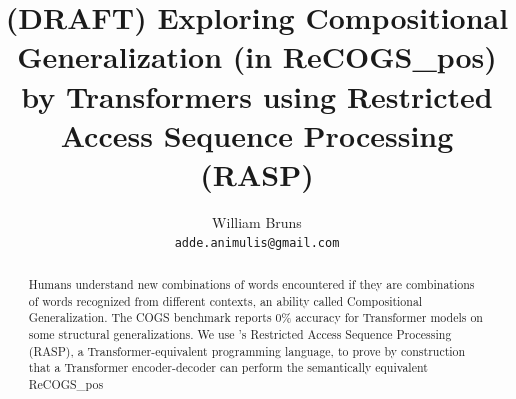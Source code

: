 \documentclass[11pt]{article}
\title{(DRAFT) Exploring Compositional Generalization (in ReCOGS\_pos) by Transformers using Restricted Access Sequence Processing (RASP)}
\author{William Bruns \\
  \texttt{adde.animulis@gmail.com}
}
\begin{document}
\maketitle
\begin{abstract}
Humans understand new combinations of words encountered if they are combinations of words recognized from different contexts, an ability called Compositional Generalization.
The COGS benchmark \cite{KimLinzen2020} reports 0\% accuracy for Transformer models on some structural generalizations.
We use \cite{Weiss2021}'s Restricted Access Sequence Processing (RASP), a Transformer-equivalent programming language, to prove by construction that a Transformer encoder-decoder
can perform the semantically equivalent ReCOGS\_pos

\end{abstract}
\end{document}
